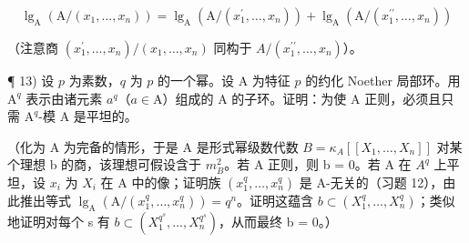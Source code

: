 \[
\lg_ {\mathrm{A}} \left(\mathrm{A} / \left(x _ {1}, \dots , x _ {n}\right)\right) = \lg_ {\mathrm{A}} \left(\mathrm{A} / \left(x _ {1} ^ {\prime}, \dots , x _ {n}\right)\right) + \lg_ {\mathrm{A}} \left(\mathrm{A} / \left(x _ {1} ^ {\prime \prime}, \dots , x _ {n}\right)\right)
\]

（注意商 \((x_{1}^{\prime},\ldots,x_{n})/(x_{1},\ldots,x_{n})\) 同构于 \(A/(x_{1}^{\prime\prime},\ldots,x_{n})\)）。

¶ 13) 设 \(p\) 为素数，\(q\) 为 \(p\) 的一个幂。设 A 为特征 \(p\) 的约化 Noether 局部环。用 \(\mathrm{A}^q\) 表示由诸元素 \(a^q\)（\(a \in \mathrm{A}\)）组成的 A 的子环。证明：为使 A 正则，必须且只需 \(\mathrm{A}^q\)-模 A 是平坦的。

（化为 A 为完备的情形，于是 A 是形式幂级数代数 \(B = \kappa_{A}[[X_{1}, \ldots, X_{n}]]\) 对某个理想 b 的商，该理想可假设含于 \(m_{B}^{2}\)。若 A 正则，则 b = 0。若 A 在 \(A^{q}\) 上平坦，设 \(x_{i}\) 为 \(X_{i}\) 在 A 中的像；证明族 \((x_{1}^{q}, \ldots, x_{n}^{q})\) 是 A-无关的（习题 12），由此推出等式 \(\lg_{\mathrm{A}}(\mathrm{A}/(x_{1}^{q}, \ldots, x_{n}^{q})) = q^{n}\)。证明这蕴含 \(b \subset (X_{1}^{q}, \ldots, X_{n}^{q})\)；类似地证明对每个 s 有 \(b \subset (X_{1}^{q^{s}}, \ldots, X_{n}^{q^{s}})\)，从而最终 b = 0。）

